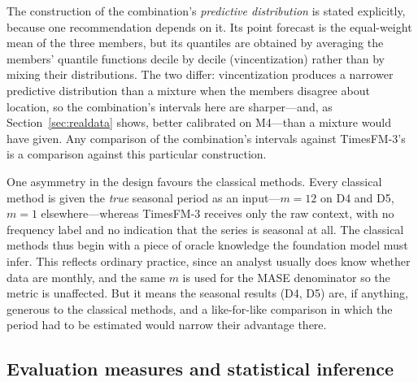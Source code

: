 \documentclass[article]{ajs}
\providecommand{\sectionref}[1]{Section~\ref{#1}}
\begin{document}
The construction of the combination's \emph{predictive distribution} is stated explicitly,
because one recommendation depends on it. Its point forecast is the equal-weight mean of the three members, but
its quantiles are obtained by averaging the members' quantile functions decile by decile
(vincentization) rather than by mixing their distributions. The two differ: vincentization
produces a narrower predictive distribution than a mixture when the members disagree about
location, so the combination's intervals here are sharper---and, as \sectionref{sec:realdata}
shows, better calibrated on M4---than a mixture would have given. Any comparison of the
combination's intervals against TimesFM-3's is a comparison against this particular construction.

One asymmetry in the design favours the classical methods.
Every classical method is given the \emph{true} seasonal period as an input---$m = 12$ on D4 and
D5, $m = 1$ elsewhere---whereas TimesFM-3 receives only the raw context, with no frequency label
and no indication that the series is seasonal at all. The classical methods thus begin with a
piece of oracle knowledge the foundation model must infer. This reflects ordinary practice, since
an analyst usually does know whether data are monthly, and the same $m$ is used for the MASE
denominator so the metric is unaffected. But it means the seasonal results (D4, D5) are, if
anything, generous to the classical methods, and a like-for-like comparison in which the period
had to be estimated would narrow their advantage there.

\subsection{Evaluation measures and statistical inference}
\label{sec:evaluation}
\end{document}
